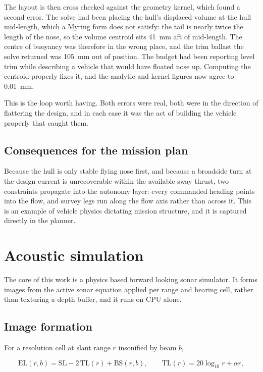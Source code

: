 \documentclass[10pt,a4paper]{article}
\begin{document}
The layout is then cross checked against the geometry kernel, which found a
second error. The solve had been placing the hull's displaced volume at the
hull mid-length, which a Myring form does not satisfy: the tail is nearly twice
the length of the nose, so the volume centroid sits \SI{41}{\milli\metre} aft
of mid-length. The centre of buoyancy was therefore in the wrong place, and the
trim ballast the solve returned was \SI{105}{\milli\metre} out of position. The
budget had been reporting level trim while describing a vehicle that would have
floated nose up. Computing the centroid properly fixes it, and the analytic and
kernel figures now agree to \SI{0.01}{\milli\metre}.

This is the loop worth having. Both errors were real, both were in the
direction of flattering the design, and in each case it was the act of building
the vehicle properly that caught them.

\subsection{Consequences for the mission plan}

Because the hull is only stable flying nose first, and because a broadside
turn at the design current is unrecoverable within the available sway thrust,
two constraints propagate into the autonomy layer: every commanded heading
points into the flow, and survey legs run along the flow axis rather than
across it. This is an example of vehicle physics dictating mission structure,
and it is captured directly in the planner.

\section{Acoustic simulation}

The core of this work is a physics based forward looking sonar simulator.
It forms images from the active sonar equation applied per range and bearing
cell, rather than texturing a depth buffer, and it runs on CPU alone.

\subsection{Image formation}

For a resolution cell at slant range $r$ insonified by beam $b$,

\begin{equation}
\mathrm{EL}(r,b) = \mathrm{SL} - 2\,\mathrm{TL}(r) + \mathrm{BS}(r,b),
\qquad
\mathrm{TL}(r) = 20\log_{10} r + \alpha r ,
\end{equation}
\end{document}
